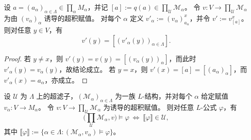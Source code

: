 \documentclass[lang=cn,a4paper,newtx,section]{elegantbook}
\begin{document}
\begin{lemma}[赋值的逐分量替换]
\label{ultraproduct-assignment-replacement}
设 $a=(a_{\alpha})_{\alpha\in\Lambda}\in\prod_{\alpha}M_{\alpha}$，并记 $[a]:=q(a)\in\prod_{\mathcal U}\mathcal M_{\alpha}$。
令 $v:V\to\prod_{\mathcal U}\mathcal M_{\alpha}$ 为由 $(v_{\alpha})_{\alpha}$ 诱导的超积赋值。
对每个 $\alpha$ 定义 $v'_{\alpha}:=(v_{\alpha})^{x}_{a_{\alpha}}$，并令 $v':=v^{x}_{[a]}$。
则对任意 $y\in V$，有
\[
  v'(y)=[(v'_{\alpha}(y))_{\alpha\in\Lambda}].
\]
\end{lemma}

\begin{proof}
若 $y\neq x$，则 $v'(y)=v(y)=[(v_{\alpha}(y))_{\alpha}]$，而此时 $v'_{\alpha}(y)=v_{\alpha}(y)$，故结论成立。
若 $y=x$，则 $v'(x)=[a]=[(a_{\alpha})_{\alpha}]$，而 $v'_{\alpha}(x)=a_{\alpha}$，亦成立。
\end{proof}

\begin{theorem}[Łoś 定理]
\label{los}
设 $\mathcal U$ 为 $\Lambda$ 上的超滤子，$(\mathcal M_{\alpha})_{\alpha\in\Lambda}$ 为一族 $L$-结构，并对每个 $\alpha$ 给定赋值 $v_{\alpha}:V\to M_{\alpha}$。
令 $v:V\to\prod_{\mathcal U}\mathcal M_{\alpha}$ 为诱导的超积赋值。
则对任意 $L$-公式 $\varphi$，有
\[
  \bigl(\prod_{\mathcal U}\mathcal M_{\alpha},v\bigr)\models\varphi\ \Longleftrightarrow\ \llbracket\varphi\rrbracket\in\mathcal U,
\]
其中 $\llbracket\varphi\rrbracket:=\{\alpha\in\Lambda:(\mathcal M_{\alpha},v_{\alpha})\models\varphi\}$。
\end{theorem}
\end{document}
